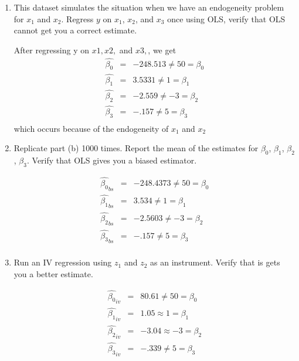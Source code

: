 \documentclass[11pt]{SelfArxOneColBMN}
\begin{document}
\begin{enumerate}
\begin{enumerate}
    \item This dataset simulates the situation when we have an endogeneity problem for $x_1$ and $x_2$. Regress $y$ on $x_1$, $x_2$, and $x_3$ once using OLS, verify that OLS cannot get you a correct estimate.
    \begin{solution}
      After regressing y on $x1, x2,$ and  $x3,$, we get
      \begin{eqnarray*}
        \hat{\beta_0} &=& -248.513  \neq 50 = \beta_0\\
        \hat{\beta_1} &=& 3.5331 \neq 1 = \beta_1\\
        \hat{\beta_2} &=& -2.559 \neq -3 = \beta_2\\
        \hat{\beta_3} &=& -.157 \neq 5 = \beta_3\\
      \end{eqnarray*}
      which occurs because of the endogeneity of $x_1$ and $x_2$
    \end{solution}
    \item Replicate part (b) 1000 times. Report the mean of the estimates for $\beta_0$, $\beta_1$, $\beta_2$, $\beta_3$. Verify that OLS gives you a biased estimator.
    \begin{solution}
      \begin{eqnarray*}
          \hat{\beta_0}_{bs} &=& -248.4373  \neq 50 = \beta_0\\
          \hat{\beta_1}_{bs} &=& 3.534 \neq 1 = \beta_1\\
          \hat{\beta_2}_{bs} &=& -2.5603 \neq -3 = \beta_2\\
          \hat{\beta_3}_{bs} &=& -.157 \neq 5 = \beta_3\\
        \end{eqnarray*}
    \end{solution}
    \item Run an IV regression using $z_1$ and $z_2$ as an instrument. Verify that is gets you a better estimate.
    \begin{solution}
      \begin{eqnarray*}
          \hat{\beta_0}_{iv} &=& 80.61  \neq 50 = \beta_0\\
          \hat{\beta_1}_{iv} &=& 1.05 \approx 1 = \beta_1\\
          \hat{\beta_2}_{iv} &=& -3.04 \approx -3 = \beta_2\\
          \hat{\beta_3}_{iv} &=& -.339 \neq 5 = \beta_3\\
        \end{eqnarray*}
    \end{solution}

\end{enumerate}
\end{enumerate}
\end{document}
